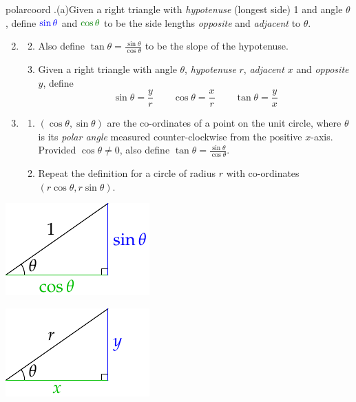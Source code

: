\begin{defn}[lower separated=false, sidebyside, sidebyside align=top seam, sidebyside gap=0pt, righthand width=0.28\linewidth]{}{polarcoord}
\hangindent{}.\lstsp(a)\lstsp Given a right triangle with \emph{hypotenuse} (longest side) 1 and angle $\theta$, define $\textcolor{blue}{\sin\theta}$ and $\textcolor{Green}{\cos\theta}$ to be the side lengths \emph{opposite} and \emph{adjacent} to $\theta$.\vspace{-5pt}
\begin{enumerate}\setcounter{enumi}{1} 
  \item[]\begin{enumerate}\setcounter{enumii}{1}
    \item[] Also define $\tan\theta=\frac{\sin\theta}{\cos\theta}$ to be the slope of the hypotenuse.
    \item Given a right triangle with angle $\theta$, \emph{hypotenuse} $r$, \emph{adjacent} $x$ and \emph{opposite} $y$, define
	\[\sin\theta=\frac yr\qquad \cos\theta=\frac xr\qquad \tan\theta=\frac yx\]
  \end{enumerate}\vspace{-8pt}
  \item\begin{enumerate}
    \item $(\cos\theta,\sin\theta)$ are the co-ordinates of a point on the unit circle, where $\theta$ is its \emph{polar angle} measured counter-clockwise from the positive $x$-axis. Provided $\cos\theta\neq 0$, also define $\tan\theta=\frac{\sin\theta}{\cos\theta}$.
    \item Repeat the definition for a circle of radius $r$ with co-ordinates $(r\cos\theta,r\sin\theta)$.
  \end{enumerate}
\end{enumerate}
\tcblower
\flushright
\includegraphics{defn-trig1}\par
\includegraphics{defn-trig2}\par

\end{defn}
